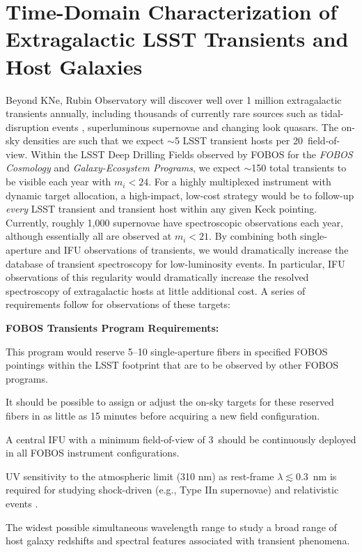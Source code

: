 \documentclass[11pt,a4paper,twoside,onecolumn,openany,final,oldfontcommands]{memoir}
\begin{document}
\section{Time-Domain Characterization of Extragalactic LSST Transients and Host Galaxies}


Beyond KNe, Rubin Observatory will discover well over 1 million extragalactic transients annually, including thousands of currently rare sources such as tidal-disruption events \citep{bricman2020}, superluminous supernovae \citep{villar2018} and changing look quasars.  The on-sky densities are such that we expect $\sim$5 LSST transient hosts per 20\arcmin\ field-of-view.  Within the LSST Deep Drilling Fields observed by FOBOS for the {\it FOBOS Cosmology} and {\it Galaxy-Ecosystem Programs}, we expect $\sim$150 total transients to be visible each year with $m_i<24$. For a highly multiplexed instrument with dynamic target allocation, a high-impact, low-cost strategy would be to follow-up \textit{every} LSST transient and transient host within any given Keck pointing. Currently, roughly 1,000 supernovae have spectroscopic observations each year, although essentially all are observed at $m_i<21$. By combining both single-aperture and IFU observations of transients, we would dramatically increase the database of transient spectroscopy for low-luminosity events.  In particular, IFU observations of this regularity would dramatically increase the resolved spectroscopy of extragalactic hosts \citep[see a recent review by][]{anderson2015} at little additional cost. A series of requirements follow for observations of these targets:


\medskip
\noindent \textbf{FOBOS Transients Program Requirements:}


\begin{programrequirement}
\reqitem This program would reserve 5--10 single-aperture fibers in specified FOBOS pointings within the LSST footprint that are to be observed by other FOBOS programs.  

\reqitem It should be possible to assign or adjust the on-sky targets for these reserved fibers in as little as 15 minutes before acquiring a new field configuration.

\end{programrequirement}

\medskip
\begin{sciencerequirement}
\reqitem A central IFU with a minimum field-of-view of 3\arcsec\ should be continuously deployed in all FOBOS instrument configurations.

\reqitem UV sensitivity to the atmospheric limit (310 nm) as rest-frame $\lambda \lesssim 0.3$~nm is required for studying shock-driven (e.g., Type IIn supernovae) and relativistic events \citep[e.g., the atypically bright Type Ib supernova AT 2018cow;][]{margutti2019}.

\reqitem The widest possible simultaneous wavelength range to study a broad range of host galaxy redshifts and spectral features associated with transient phenomena.  
\end{sciencerequirement}
\end{document}
